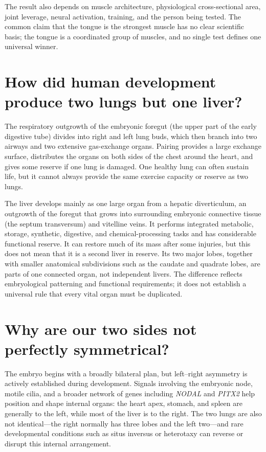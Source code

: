 \documentclass[11pt,oneside]{report}
\begin{document}
The result also depends on muscle architecture, physiological cross-sectional
area, joint leverage, neural activation, training, and the person being tested.
The common claim that the tongue is the strongest muscle has no clear scientific
basis; the tongue is a coordinated group of muscles, and no single test defines
one universal winner.

\section{How did human development produce two lungs but one liver?}

The respiratory outgrowth of the embryonic foregut (the upper part of the early
digestive tube) divides into right and left lung buds, which then branch into
two airways and two extensive gas-exchange organs. Pairing provides a large
exchange surface, distributes the organs on both sides of the chest around the
heart, and gives some reserve if one lung is damaged. One healthy lung can often
sustain life, but it cannot always provide the same exercise capacity or reserve
as two lungs.

The liver develops mainly as one large organ from a hepatic diverticulum, an
outgrowth of the foregut that grows into surrounding embryonic connective
tissue (the septum transversum) and vitelline veins. It performs integrated metabolic, storage, synthetic,
digestive, and chemical-processing tasks and has considerable functional
reserve. It can restore much of its mass after some injuries, but this does not
mean that it is a second liver in reserve. Its two major lobes, together with
smaller anatomical subdivisions such as the caudate and quadrate lobes, are parts
of one connected organ, not independent livers. The difference reflects
embryological patterning and functional requirements; it does not establish a
universal rule that every vital organ must be duplicated.

\section{Why are our two sides not perfectly symmetrical?}

The embryo begins with a broadly bilateral plan, but left--right asymmetry is
actively established during development. Signals involving the embryonic node,
motile cilia, and a broader network of genes including \emph{NODAL} and
\emph{PITX2} help position and shape internal organs: the heart apex, stomach,
and spleen are generally to the left, while most of the liver is to the right.
The two lungs are also not identical---the right normally has three lobes and
the left two---and rare developmental conditions such as situs inversus or
heterotaxy can reverse or disrupt this internal arrangement.
\end{document}
